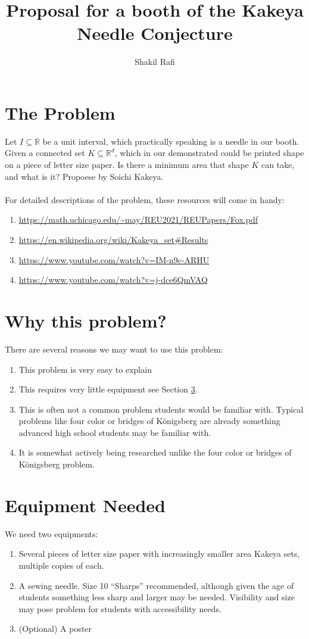 \documentclass{article}
\begin{document}
	\title{Proposal for a booth of the Kakeya Needle Conjecture}
	\author{Shakil Rafi}
	\maketitle
	
	\section{The Problem}
	Let $I \subseteq \mathbb{R}$ be a unit interval, which practically speaking is a needle in our booth. Given a connected  set $K \subseteq \mathbb{R}^d$, which in our demonstrated could be printed shape on a piece of letter size paper. Is there a minimum area that shape $K$ can take, and what is it? Propoese by Soichi Kakeya. 
	\\~\\
	For detailed descriptions of the problem, these resources will come in handy:
	\begin{enumerate}
		\item \url{https://math.uchicago.edu/~may/REU2021/REUPapers/Fox.pdf}
		\item \url{https://en.wikipedia.org/wiki/Kakeya_set#Results}
		\item \url{https://www.youtube.com/watch?v=IM-n9c-ARHU}
		\item \url{https://www.youtube.com/watch?v=j-dce6QmVAQ}
	\end{enumerate}
	\section{Why this problem?}
	There are several reasons we may want to use this problem:
	\begin{enumerate}
		\item This problem is very easy to explain
		\item This requires very little equipment see Section \ref{sec:equip}. 
		\item This is often not a common problem students would be familiar with. Typical problems like four color or bridges of K\"onigsberg are already something advanced high school students may be familiar with.
		\item It is somewhat actively being researched unlike the four color or bridges of K\"onigsberg problem. 
	\end{enumerate}
	\section{Equipment Needed}\label{sec:equip}
	We need two equipments:
	\begin{enumerate}
		\item Several pieces of letter size paper with increasingly smaller area Kakeya sets, multiple copies of each.
		\item A sewing needle. Size 10 ``Sharps'' recommended, although given the age of students something less sharp and larger may be needed. Visibility and size may pose problem for students with accessibility needs. 
		\item (Optional) A poster
	\end{enumerate}
\end{document}
